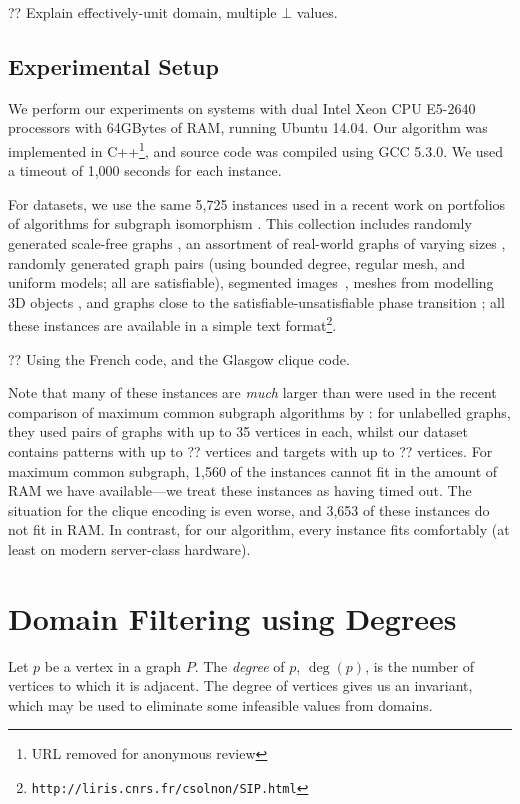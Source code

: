 \documentclass[letterpaper]{article}
\newcommand{\citet}[1]{\citeauthor{#1} \shortcite{#1}}
\theoremstyle{definition}
\begin{document}
?? Explain effectively-unit domain, multiple $\bot$ values.

\subsection{Experimental Setup} \label{section:setup}

We perform our experiments on systems with dual Intel Xeon CPU E5-2640 processors with 64GBytes of
RAM, running Ubuntu 14.04. Our algorithm was implemented in C++\footnote{URL removed for anonymous
review}, and source code was compiled using
GCC 5.3.0. We used a timeout of 1,000 seconds for each instance.

For datasets, we use the same 5,725 instances used in a recent work on portfolios of algorithms for
subgraph isomorphism \cite{thelionpaper}. This collection includes randomly generated scale-free
graphs \cite{constraints10}, an assortment of real-world graphs of varying sizes \cite{LV02},
randomly generated graph pairs (using bounded degree, regular mesh, and uniform models; all are
satisfiable), segmented images~\cite{pr15,cviu11}, meshes from modelling 3D objects \cite{cviu11},
and graphs close to the satisfiable-unsatisfiable phase transition
\cite{DBLP:conf/ijcai/McCreeshPT16}; all these instances are available in a simple text
format\footnote{\texttt{http://liris.cnrs.fr/csolnon/SIP.html}}.

?? Using the French code, and the Glasgow clique code.

Note that many of these instances are \emph{much} larger than were used in the recent comparison of
maximum common subgraph algorithms by \citet{DBLP:conf/cp/McCreeshNPS16}: for unlabelled graphs,
they used pairs of graphs with up to 35 vertices in each, whilst our dataset contains patterns with
up to ?? vertices and targets with up to ?? vertices. For maximum common subgraph, 1,560 of the
instances cannot fit in the amount of RAM we have available---we treat these instances as having
timed out. The situation for the clique encoding is even worse, and 3,653 of these instances do not
fit in RAM. In contrast, for our algorithm, every instance fits comfortably (at least on modern
server-class hardware).

\section{Domain Filtering using Degrees}\label{section:degreefiltering}

Let $p$ be a vertex in a graph $P$. The \emph{degree} of $p$, $\deg(p)$, is the number of vertices
to which it is adjacent. The degree of vertices gives us an invariant, which may be used to
eliminate some infeasible values from domains.
\end{document}

